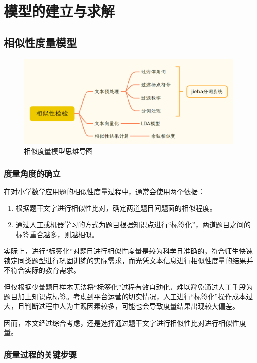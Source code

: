 \section{模型的建立与求解}

\subsection{相似性度量模型}

\begin{figure}[htbp]
    \centering
    \includegraphics[scale=0.2]{res/figure040956.png}
    \caption{相似度量模型思维导图}
\end{figure}

\subsubsection{度量角度的确立}

在对小学数学应用题的相似性度量过程中，通常会使用两个依据：

\begin{enumerate}
    \item 根据题干文字进行相似性比对，确定两道题目间题面的相似程度。
    \item 通过人工或机器学习的方式为题目根据知识点进行“标签化”，两道题目之间的标签重合越多，则越相似。
\end{enumerate}

实际上，进行“标签化”对题目进行相似性度量是较为科学且准确的，符合师生快速锁定同类题型进行巩固训练的实际需求，而光凭文本信息进行相似性度量的结果并不符合实际的教育需求。

但仅根据少量题目样本无法将“标签化”过程有效自动化，难以避免通过人工手段为题目加上知识点标签。考虑到平台运营的切实情况，人工进行“标签化”操作成本过大，且判断过程中人为主观因素较多，可能也会导致度量结果出现较大偏差。

因而，本文经过综合考虑，还是选择通过题干文字进行相似性比对进行相似性度量。

\subsubsection{度量过程的关键步骤}


